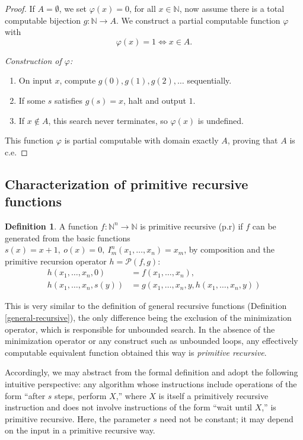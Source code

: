 \documentclass{pracalicmgr2025}
\theoremstyle{plain}            %
\theoremstyle{remark}           %
\theoremstyle{definition}       %
\newtheorem{definition}[theorem]{Definition}
\begin{document}
\begin{proof}
If $A = \emptyset$, we set $\varphi(x) = 0$, for all $x\in \mathbb{N}$, now assume there is a total computable bijection $g:\mathbb{N}\to A$.
We construct a partial computable function $\varphi$ with
$$
\varphi(x)=1 \iff x\in A.
$$

\emph{Construction of $\varphi$:}
\begin{enumerate}
    \item On input $x$, compute $g(0),g(1),g(2),\dots$ sequentially.
    \item If some $s$ satisfies $g(s)=x$, halt and output $1$.
    \item If $x\notin A$, this search never terminates, so $\varphi(x)$ is undefined.
\end{enumerate}

This function $\varphi$ is partial computable with domain exactly $A$, proving that $A$ is c.e.

\medskip
\end{proof}



\subsection{Characterization of primitive recursive functions} \label{primitive recursive functions}
\begin{definition} \label{Def 2.4} A function $f:\mathbb{N}^n\to\mathbb{N}$ is primitive recursive (p.r) if $f$ can be generated from the basic functions $s(x) = x + 1, \ o(x)=0, \ I^{n}_{m}(x_1, \dots,x_n) = x_m$, by composition and the primitive recursion operator $h = \mathcal{P}(f,g):$
\begin{align*}
h(x_1,\dots,x_n,0) &= f(x_1,\dots,x_n),\\
h(x_1,\dots,x_n,s(y)) &= g(x_1,\dots,x_n,y,h(x_1,\dots,x_n,y))
\end{align*}
\end{definition}

This is very similar to the definition of general recursive functions (Definition \ref{general-recursive}), the only difference being the exclusion of the minimization operator, which is responsible for unbounded search. In the absence of the minimization operator or any construct such as unbounded loops, any effectively computable equivalent function obtained this way is \textit{primitive recursive}. 

Accordingly, we may abstract from the formal definition and adopt the following intuitive perspective: any algorithm whose instructions include operations of the form “after $s$ steps, perform $X$,” where $X$ is itself a primitively recursive instruction and does not involve instructions of the form “wait until $X$,” is primitive recursive. Here, the parameter $s$ need not be constant; it may depend on the input in a primitive recursive way.
\end{document}
